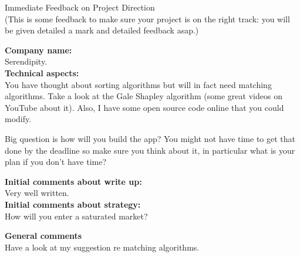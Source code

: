 \documentclass{article}
\begin{document}
\begin{center}
\Huge{Immediate Feedback on Project Direction}\\
\tiny{(This is some feedback to make sure your project is on the right track: you will be given detailed a mark and detailed feedback asap.)}
\end{center}


\normalsize
\textbf{Company name:}\\

Serendipity. \\

\textbf{Technical aspects:}\\

You have thought about sorting algorithms but will in fact need matching algorithms.
Take a look at the Gale Shapley algorithm (some great videos on YouTube about it).
Also, I have some open source code online that you could modify.

Big question is how will you build the app?
You might not have time to get that done by the deadline so make sure you think about it, in particular what is your plan if you don't have time?

\textbf{Initial comments about write up:}\\

Very well written.\\

\textbf{Initial comments about strategy:}\\

How will you enter a saturated market?

\textbf{General comments}\\

Have a look at my suggestion re matching algorithms.
\end{document}
